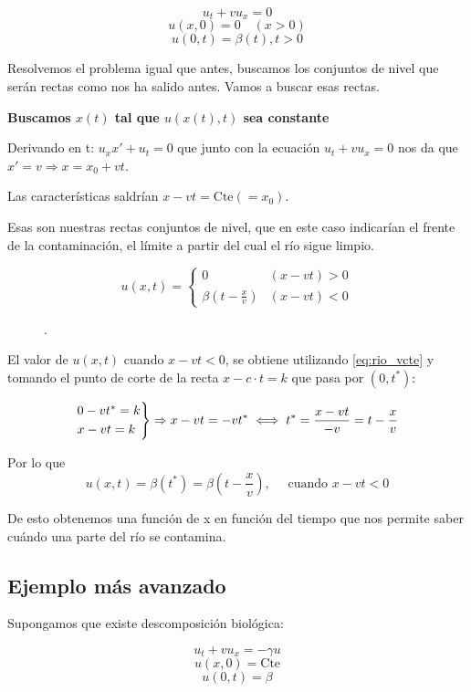 		$$u_t + vu_x = 0$$
		$$u(x,0) = 0 \quad (x>0) $$
		$$u(0,t) = \beta(t), t>0$$


		Resolvemos el problema igual que antes, buscamos los conjuntos de nivel que serán rectas como nos ha salido antes. Vamos a buscar esas rectas.

		\textbf{Buscamos $x(t)$ tal que $u(x(t),t)$ sea constante}

		Derivando en t: $u_x x' + u_t = 0$ que junto con la ecuación $u_t + v u_x = 0$ nos da que $x' = v \Rightarrow x = x_0 + vt $.

		Las características saldrían \(x-vt = \text{Cte}(=x_0) \label{eq:rio_vcte}\).

		Esas son nuestras rectas conjuntos de nivel, que en este caso indicarían el frente de la contaminación, el límite a partir del cual el río sigue limpio.

		$$u(x,t) =
			\begin{cases}
				0                      & (x-vt) > 0 \\
				\beta(t - \frac{x}{v}) & (x-vt) < 0
			\end{cases}
		$$

		\begin{figure}[hbtp]
			\centering
			\caption{}.
			\label{fig:ContaminacionRio}
		\end{figure}

		El valor de $u(x,t)$ cuando $x-vt < 0$, se obtiene utilizando \ref{eq:rio_vcte} y tomando el punto de corte de la recta $x-c \cdot t=k$ que pasa por $(0,t^*)$:

		$$
		\begin{rcases}
			0 - vt^{*} = k \\
			x - vt = k
		\end{rcases}
		 \Rightarrow x-vt = -vt^{*} \iff t^* = \frac{x-vt}{-v} = t - \frac{x}{v}$$

		Por lo que
		$$u(x,t) = \beta(t^*) = \beta(t - \frac{x}{v}), \quad \text{ cuando } x - vt < 0$$

		De esto obtenemos una función de x en función del tiempo que nos permite saber cuándo una parte del río se contamina.

	\subsection{Ejemplo más avanzado}

		Supongamos que existe descomposición biológica:

		$$u_t + vu_x = -\gamma u$$
		$$u(x,0) = \text{Cte}$$
		$$u(0,t) = \beta$$

